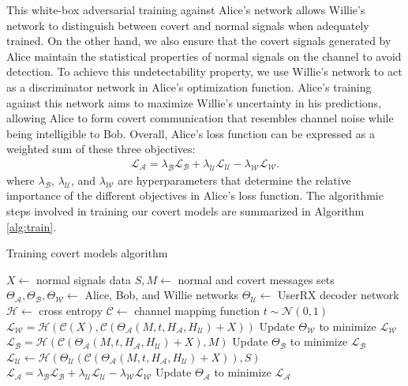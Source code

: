 This white-box adversarial training against Alice's network allows Willie's network to distinguish between covert and normal signals when adequately trained. On the other hand, we also ensure that the covert signals generated by Alice maintain the statistical properties of normal signals on the channel to avoid detection. To achieve this undetectability property, we use Willie's network to act as a discriminator network in Alice's optimization function. Alice's training against this network aims to maximize Willie's uncertainty in his predictions, allowing Alice to form covert communication that resembles channel noise while being intelligible to Bob. Overall, Alice's loss function can be expressed as a weighted sum of these three objectives:
\begin{equation}
	\begin{array}{l} \label{alice_loss}
		\mathcal{L}_{\mathcal{A}} = \lambda_{\mathcal{B}} \mathcal{L}_{\mathcal{B}} + \lambda_{\mathcal{U}} \mathcal{L}_{\mathcal{U}} - \lambda_{\mathcal{W}} \mathcal{L}_{\mathcal{W}}.
	\end{array}
\end{equation}
where \(\lambda_{\mathcal{B}}\), \(\lambda_{\mathcal{U}}\), and \(\lambda_{\mathcal{W}}\) are hyperparameters that determine the relative importance of the different objectives in Alice's loss function. The algorithmic steps involved in training our covert models are summarized in Algorithm \ref{alg:train}.

\begin{algorithm}[tp!]
	\caption{Training covert models algorithm}\label{alg:train}
	\small
	\begin{algorithmic}
		\State $X \gets$ normal signals data
		\State $S, M \gets$ normal and covert messages sets
		\State $\Theta_{\mathcal{A}}, \Theta_{\mathcal{B}}, \Theta_{\mathcal{W}} \gets$ Alice, Bob, and Willie networks
		\State $\Theta_{\mathcal{U}} \gets$ UserRX decoder network
		\State $\mathcal{H} \gets$ cross entropy 
		\State $\mathcal{C} \gets$ channel mapping function
		\State $t \sim \mathcal{N}(0, 1)$
		\State $\mathcal{L}_{\mathcal{W}} = \mathcal{H}(\mathcal{C}(X), \mathcal{C}(\Theta_{\mathcal{A}}(M, t, H_{\mathcal{A}}, H_{\mathcal{U}}) + X))$
		\State Update $\Theta_{\mathcal{W}}$ to minimize $\mathcal{L}_{\mathcal{W}}$
		\State $\mathcal{L}_{\mathcal{B}} = \mathcal{H}(\mathcal{C}(\Theta_{\mathcal{A}}(M, t, H_{\mathcal{A}}, H_{\mathcal{U}}) + X), M)$
		\State Update $\Theta_{\mathcal{B}}$ to minimize $\mathcal{L}_{\mathcal{B}}$
		\State $\mathcal{L}_{\mathcal{U}} \gets \mathcal{H}(\Theta_{\mathcal{U}}(\mathcal{C}(\Theta_{\mathcal{A}}(M, t, H_{\mathcal{A}}, H_{\mathcal{U}}) + X)), S)$
		\State
		$\mathcal{L}_{\mathcal{A}} = \lambda_{\mathcal{B}} \mathcal{L}_{\mathcal{B}} + \lambda_{\mathcal{U}} \mathcal{L}_{\mathcal{U}} - \lambda_{\mathcal{W}} \mathcal{L}_{\mathcal{W}}$
		\State Update $\Theta_{\mathcal{A}}$ to minimize $\mathcal{L}_{\mathcal{A}}$
		\EndFor
	\end{algorithmic}
\end{algorithm}


